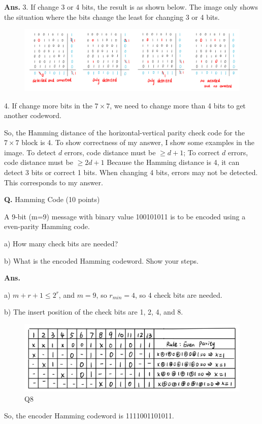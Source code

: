 \documentclass[12pt, a4paper, UTF8, fontset=windows]{ctexbook}
\newcounter{problemname}
\newenvironment{problem}{\begin{shaded}\stepcounter{problemname}\par\noindent\textbf{Q\arabic{problemname}.}}{\end{shaded}\par}
\newenvironment{solution}{\par\noindent\textbf{Ans.}}{\par}
\begin{document}
\begin{solution}
    3. If change 3 or 4 bits, the result is as shown below. The image only shows the situation where the bits change the least for changing 3 or 4 bits.

    \begin{figure}[H]
        \centering
        \includegraphics[width=0.9\linewidth]{../src/Q7-2.jpg}  %
        \label{fig:7_2}
    \end{figure}

    4. If change more bits in the $7 \times 7$, we need to change more than 4 bits to get another codeword.

    So, the Hamming distance of the horizontal-vertical parity check code for the $7 \times 7$ block is 4. 
    To show correctness of my answer, I show some examples in the image. To detect $d$ errors, code distance must be $\geq d + 1$; To correct $d$ errors, code distance must be $\geq 2d + 1$ 
    Because the Hamming distance is 4, it can detect 3 bits or correct 1 bits. When changing 4 bits, errors may not be detected. This corresponds to my answer.
\end{solution}


\begin{problem}
    Hamming Code (10 points)

    A 9-bit (m=9) message with binary value 100101011 is to be encoded using a even-parity    Hamming code.

    a) How many check bits are needed?

    b) What is the encoded Hamming codeword. Show your steps.    
\end{problem}

\begin{solution}

    a) $m + r + 1 \leq 2^r$, and $m=9$, so $r_{min}=4$, so 4 check bits are needed.

    b) The insert position of the check bits are 1, 2, 4, and 8. 
    \begin{figure}[H]
        \centering
        \includegraphics[width=0.6\linewidth]{../src/Q8.jpg}  %
        \caption{Q8}
        \label{fig:Q8}
    \end{figure}

    So, the encoder Hamming codeword is 1111001101011.
\end{solution}
\end{document}
